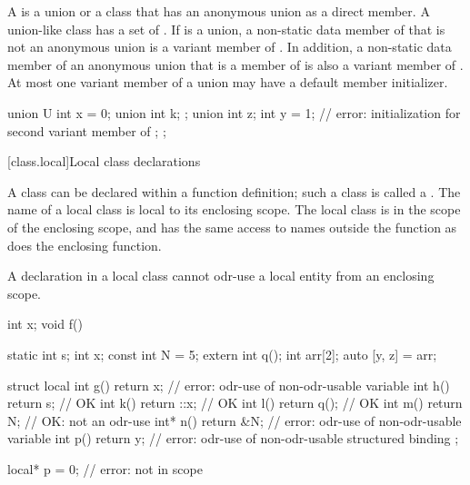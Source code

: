 \pnum
{}%
%
A  is a union or a class that has an anonymous union as a direct
member. A union-like class  has a set of .
If  is a union, a non-static data member of  that is not an anonymous
union is a variant member of . In addition, a non-static data member of an
anonymous union that is a member of  is also a variant member of .
At most one variant member of a union may have a default member initializer.
\begin{example}
\begin{codeblock}
union U {
  int x = 0;
  union {
    int k;
  };
  union {
    int z;
    int y = 1;      // error: initialization for second variant member of 
  };
};
\end{codeblock}
\end{example}

[class.local]{Local class declarations}
%
%
%

\pnum
A class can be declared within a function definition; such a class is
called a . The name of a local class is local to
its enclosing scope.
%
The local class is in the scope of the enclosing scope, and has the same
access to names outside the function as does the enclosing function.
\begin{note}
A declaration in a local class
cannot odr-use
a local entity
from an
enclosing scope.
\end{note}
\begin{example}
\begin{codeblock}
int x;
void f() {
  static int s;
  int x;
  const int N = 5;
  extern int q();
  int arr[2];
  auto [y, z] = arr;

  struct local {
    int g() { return x; }       // error: odr-use of non-odr-usable variable 
    int h() { return s; }       // OK
    int k() { return ::x; }     // OK
    int l() { return q(); }     // OK
    int m() { return N; }       // OK: not an odr-use
    int* n() { return &N; }     // error: odr-use of non-odr-usable variable 
    int p() { return y; }       // error: odr-use of non-odr-usable structured binding 
  };
}

local* p = 0;                   // error:  not in scope
\end{codeblock}
\end{example}

